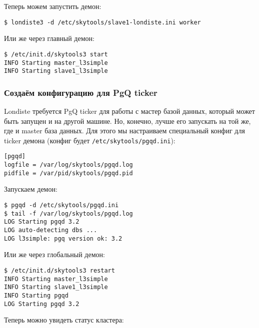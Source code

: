 Теперь можем запустить демон:

\begin{lstlisting}[label=lst:londiste-replica11,caption=Запускаем демон для slave базы]
$ londiste3 -d /etc/skytools/slave1-londiste.ini worker
\end{lstlisting}

Или же через главный демон:

\begin{lstlisting}[label=lst:londiste-replica12,caption=Запускаем демон для slave базы]
$ /etc/init.d/skytools3 start
INFO Starting master_l3simple
INFO Starting slave1_l3simple
\end{lstlisting}


\subsubsection{Создаём конфигурацию для PgQ ticker}

Londiste требуется PgQ ticker для работы с мастер базой данных, который может быть запущен и на другой машине. Но, конечно, лучше его запускать на той же, где и master база данных. Для этого мы настраиваем специальный конфиг для ticker демона (конфиг будет \lstinline!/etc/skytools/pgqd.ini!):

\begin{lstlisting}[label=lst:londiste-replica13,caption=PgQ ticker конфиг]
[pgqd]
logfile = /var/log/skytools/pgqd.log
pidfile = /var/pid/skytools/pgqd.pid
\end{lstlisting}

Запускаем демон:

\begin{lstlisting}[label=lst:londiste-replica11,caption=Запускаем PgQ ticker]
$ pgqd -d /etc/skytools/pgqd.ini
$ tail -f /var/log/skytools/pgqd.log
LOG Starting pgqd 3.2
LOG auto-detecting dbs ...
LOG l3simple: pgq version ok: 3.2
\end{lstlisting}

Или же через глобальный демон:

\begin{lstlisting}[label=lst:londiste-replica12,caption=Запускаем PgQ ticker]
$ /etc/init.d/skytools3 restart
INFO Starting master_l3simple
INFO Starting slave1_l3simple
INFO Starting pgqd
LOG Starting pgqd 3.2
\end{lstlisting}

Теперь можно увидеть статус кластера:

